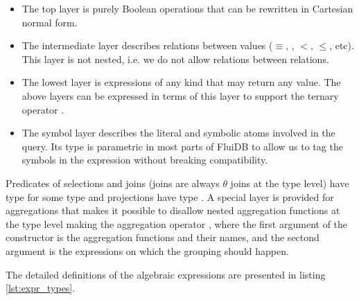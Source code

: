 \begin{itemize}
\item The top layer is purely Boolean operations  that
  can be rewritten in Cartesian normal form.
\item The intermediate layer  describes relations between values
  (\(\equiv\), , \(<\), \(\le\), etc). This layer is not
  nested, i.e. we do not allow relations between relations.
\item The lowest layer  is expressions of any kind that may
  return any value. The above layers can be expressed in terms of this
  layer to support the ternary operator .
\item The symbol layer describes the literal and symbolic atoms involved in the query.
  Its type is parametric in most parts of FluiDB to allow
  us to tag the symbols in the expression without breaking compatibility.
\end{itemize}

Predicates of selections and joins (joins are always \(\theta\) joins
at the type level) have type  for some type
 and projections have type . A
special layer is provided for aggregations  that makes it
possible to disallow nested aggregation functions at the type level
making the aggregation operator , where the first argument of the constructor is the
aggregation functions and their names, and the sectond argument is the
expressions on which the grouping should happen.

The detailed definitions of the algebraic expressions are presented in
listing \ref{lst:expr_types}.

